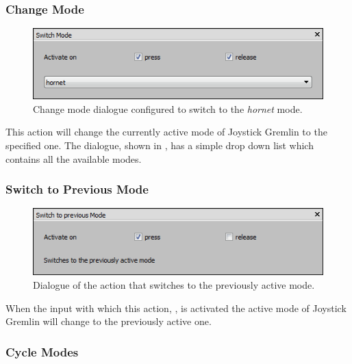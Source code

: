 \documentclass[a4, 10pt]{article}
\newcommand{\JG}{Joystick Gremlin}
\begin{document}
\subsubsection{Change Mode}

\begin{figure}[bt]
    \centering

    \includegraphics[width=0.75\linewidth]{images/action_switch_mode}
    \caption{Change mode dialogue configured to switch to the
        \emph{hornet} mode.}
    \label{fig:action_change_mode}
\end{figure}

This action will change the currently active mode of \JG{} to the
specified one. The dialogue, shown in , has
a simple drop down list which contains all the available modes.


\subsubsection{Switch to Previous Mode}

\begin{figure}[bt]
    \centering

    \includegraphics[width=0.75\linewidth]{images/action_switch_previous_mode}
    \caption{Dialogue of the action that switches to the previously
    active mode.}
    \label{fig:action_previous_mode}
\end{figure}

When the input with which this action, , is
activated the active mode of \JG{} will change to the previously active
one.


\subsubsection{Cycle Modes}
\end{document}

